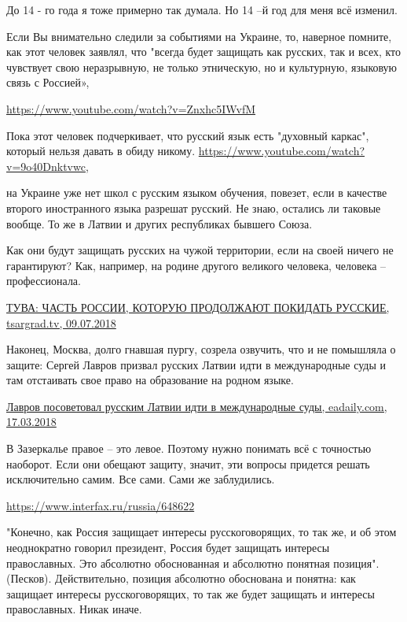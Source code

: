 \begin{itemize}
\begin{itemize}
До 14 - го года я тоже примерно так думала. Но 14 –й год для меня всё изменил.

Если Вы внимательно следили за событиями на Украине, то, наверное помните, как
этот человек заявлял, что "всегда будет защищать как русских, так и всех, кто
чувствует свою неразрывную, не только этническую, но и культурную, языковую
связь с Россией», 

\url{https://www.youtube.com/watch?v=Znxhc5IWvfM}

Пока этот человек подчеркивает, что русский язык есть "духовный каркас",
который нельзя давать в обиду никому.
\url{https://www.youtube.com/watch?v=9o40Dnktvwc},

на Украине уже нет школ с русским языком обучения, повезет, если в качестве
второго иностранного языка разрешат русский. Не знаю, остались ли таковые
вообще. То же в Латвии и других республиках бывшего Союза.

Как они будут защищать русских на чужой территории, если на своей ничего не
гарантируют? Как, например, на родине другого великого человека, человека –
профессионала. 

\href{https://tsargrad.tv/articles/tuva-chast-rossii-kotoruju-prodolzhajut-pokidat-russkie_145103}{%
ТУВА: ЧАСТЬ РОССИИ, КОТОРУЮ ПРОДОЛЖАЮТ ПОКИДАТЬ РУССКИЕ, tsargrad.tv, 09.07.2018%
}

Наконец, Москва, долго гнавшая пургу, созрела озвучить, что и не помышляла о защите:
Сергей Лавров призвал русских Латвии идти в международные суды и там отстаивать свое право на образование на родном языке. 

\href{https://eadaily.com/ru/news/2018/03/17/lavrov-posovetoval-russkim-latvii-idti-v-mezhdunarodnye-sudy}{%
Лавров посоветовал русским Латвии идти в международные суды, eadaily.com, 17.03.2018%
}

В Зазеркалье правое – это левое. Поэтому нужно понимать всё с точностью
наоборот. Если они обещают защиту, значит, эти вопросы придется решать
исключительно самим. Все сами. Сами же заблудились.

\url{https://www.interfax.ru/russia/648622}

"Конечно, как Россия защищает интересы русскоговорящих, то так же, и об этом
неоднократно говорил президент, Россия будет защищать интересы православных.
Это абсолютно обоснованная и абсолютно понятная позиция". (Песков).
Действительно, позиция абсолютно обоснована и понятна: как защищает интересы
русскоговорящих, то так же будет защищать и интересы православных. Никак иначе.


\end{itemize}
\end{itemize}
